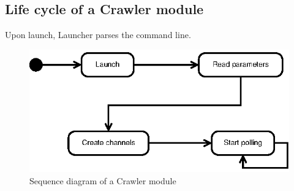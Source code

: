 \subsection{Life cycle of a Crawler module}

Upon launch, Launcher parses the command line.

\begin{figure}[htp]
  \centering
  \includegraphics{image/sequence-diagram-crawler}
  \caption{Sequence diagram of a Crawler module}
\end{figure}
